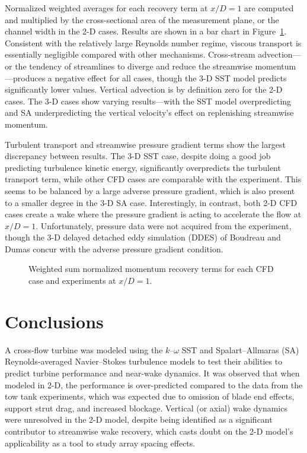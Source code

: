 Normalized weighted averages for each recovery term at $x/D=1$ are computed and
multiplied by the cross-sectional area of the measurement plane, or the channel
width in the 2-D cases. Results are shown in a bar chart in
Figure~\ref{fig:recovery}. Consistent with the relatively large Reynolds number
regime, viscous transport is essentially negligible compared with other
mechanisms. Cross-stream advection---or the tendency of streamlines to diverge
and reduce the streamwise momentum---produces a negative effect for all cases,
though the 3-D SST model predicts significantly lower values. Vertical advection
is by definition zero for the 2-D cases. The 3-D cases show varying
results---with the SST model overpredicting and SA underpredicting the vertical
velocity's effect on replenishing streamwise momentum.

Turbulent transport and streamwise pressure gradient terms show the largest
discrepancy between results. The 3-D SST case, despite doing a good job
predicting turbulence kinetic energy, significantly overpredicts the turbulent
transport term, while other CFD cases are comparable with the experiment. This
seems to be balanced by a large adverse pressure gradient, which is also present
to a smaller degree in the 3-D SA case. Interestingly, in contrast, both 2-D CFD
cases create a wake where the pressure gradient is acting to accelerate the flow
at $x/D=1$. Unfortunately, pressure data were not acquired from the experiment,
though the 3-D delayed detached eddy simulation (DDES) of Boudreau and Dumas
\cite{Boudreau2015} concur with the adverse pressure gradient condition.

\begin{figure}[ht]
    \centering


    \caption{Weighted sum normalized momentum recovery terms for each CFD case
        and experiments\cite{Bachant2016-RVAT-Re-dep} at $x/D=1$.}

    \label{fig:recovery}
\end{figure}


\section{Conclusions}

A cross-flow turbine was modeled using the $k$--$\omega$ SST and
Spalart--Allmaras (SA) Reynolds-averaged Navier--Stokes turbulence models to test
their abilities to predict turbine performance and near-wake dynamics. It was
observed that when modeled in 2-D, the performance is over-predicted compared to
the data from the tow tank experiments, which was expected due to omission of
blade end effects, support strut drag, and increased blockage. Vertical (or
axial) wake dynamics were unresolved in the 2-D model, despite being identified
as a significant contributor to streamwise wake recovery, which casts doubt on
the 2-D model's applicability as a tool to study array spacing effects.

